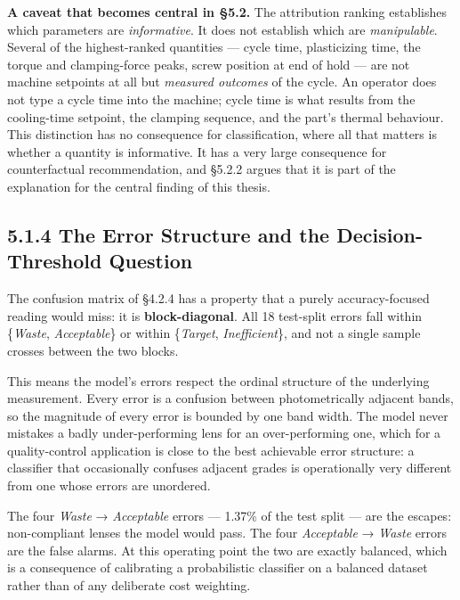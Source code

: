 \textbf{A caveat that becomes central in §5.2.} The attribution ranking establishes which parameters are \emph{informative}. It does not establish which are \emph{manipulable}. Several of the highest-ranked quantities --- cycle time, plasticizing time, the torque and clamping-force peaks, screw position at end of hold --- are not machine setpoints at all but \emph{measured outcomes} of the cycle. An operator does not type a cycle time into the machine; cycle time is what results from the cooling-time setpoint, the clamping sequence, and the part's thermal behaviour. This distinction has no consequence for classification, where all that matters is whether a quantity is informative. It has a very large consequence for counterfactual recommendation, and §5.2.2 argues that it is part of the explanation for the central finding of this thesis.

\hypertarget{the-error-structure-and-the-decision-threshold-question}{%
\subsection{5.1.4 The Error Structure and the Decision-Threshold Question}\label{the-error-structure-and-the-decision-threshold-question}}

The confusion matrix of §4.2.4 has a property that a purely accuracy-focused reading would miss: it is \textbf{block-diagonal}. All 18 test-split errors fall within \{\emph{Waste}, \emph{Acceptable}\} or within \{\emph{Target}, \emph{Inefficient}\}, and not a single sample crosses between the two blocks.

This means the model's errors respect the ordinal structure of the underlying measurement. Every error is a confusion between photometrically adjacent bands, so the magnitude of every error is bounded by one band width. The model never mistakes a badly under-performing lens for an over-performing one, which for a quality-control application is close to the best achievable error structure: a classifier that occasionally confuses adjacent grades is operationally very different from one whose errors are unordered.

The four \emph{Waste} → \emph{Acceptable} errors --- 1.37\% of the test split --- are the escapes: non-compliant lenses the model would pass. The four \emph{Acceptable} → \emph{Waste} errors are the false alarms. At this operating point the two are exactly balanced, which is a consequence of calibrating a probabilistic classifier on a balanced dataset rather than of any deliberate cost weighting.

